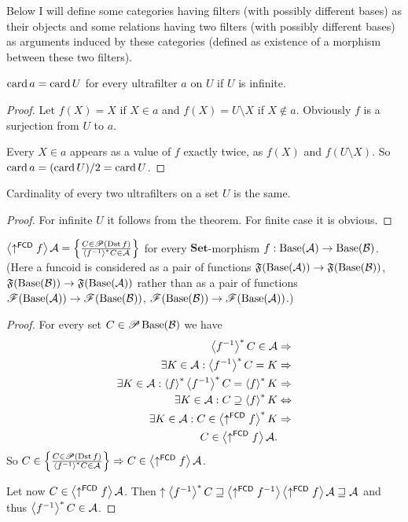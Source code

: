 Below I will define some categories having filters (with possibly
different bases) as their objects and some relations having two filters
(with possibly different bases) as arguments induced by these categories
(defined as existence of a morphism between these two filters).
\begin{thm}
$\operatorname{card} a=\operatorname{card} U$ for every ultrafilter $a$ on $U$ if $U$ is infinite.\end{thm}
\begin{proof}
Let $f(X)=X$ if $X\in a$ and $f(X)=U\setminus X$ if $X\notin a$.
Obviously $f$ is a surjection from $U$ to $a$.

Every $X\in a$ appears as a value of $f$ exactly twice, as $f(X)$
and $f(U\setminus X)$. So $\operatorname{card} a=(\operatorname{card} U)/2=\operatorname{card} U$.\end{proof}
\begin{cor}
Cardinality of every two ultrafilters on a set $U$ is the same.\end{cor}
\begin{proof}
For infinite $U$ it follows from the theorem. For finite case it
is obvious.\end{proof}
\begin{prop}
$\left\langle \uparrow^{\mathsf{FCD}}f\right\rangle\mathcal{A}=\left\{ \frac{C\in\mathscr{P}(\operatorname{Dst} f)}{\left\langle f^{-1}\right\rangle ^{\ast}C\in\mathcal{A}}\right\}$
for every $\mathbf{Set}$-morphism $f:\operatorname{Base}(\mathcal{A})\rightarrow\operatorname{Base}(\mathcal{B})$.
(Here a funcoid is considered as a pair of functions $\mathfrak{F}(\operatorname{Base}(\mathcal{A}))\rightarrow\mathfrak{F}(\operatorname{Base}(\mathcal{B}))$,
$\mathfrak{F}(\operatorname{Base}(\mathcal{B}))\rightarrow\mathfrak{F}(\operatorname{Base}(\mathcal{A}))$
rather than as a pair of functions $\mathscr{F}(\operatorname{Base}(\mathcal{A}))\rightarrow\mathscr{F}(\operatorname{Base}(\mathcal{B}))$,
$\mathscr{F}(\operatorname{Base}(\mathcal{B}))\rightarrow\mathscr{F}(\operatorname{Base}(\mathcal{A}))$.)\end{prop}
\begin{proof}
For every set $C\in\mathscr{P}\operatorname{Base}(\mathcal{B})$ we have
\begin{align*}
\left\langle f^{-1}\right\rangle ^{\ast}C\in\mathcal{A} & \Rightarrow\\
\exists K\in\mathcal{A}:\left\langle f^{-1}\right\rangle ^{\ast}C=K & \Rightarrow\\
\exists K\in\mathcal{A}:\left\langle f\right\rangle ^{\ast}\left\langle f^{-1}\right\rangle ^{\ast}C=\left\langle f\right\rangle ^{\ast}K & \Rightarrow\\
\exists K\in\mathcal{A}:C\supseteq\left\langle f\right\rangle ^{\ast}K & \Leftrightarrow\\
\exists K\in\mathcal{A}:C\in\left\langle \uparrow^{\mathsf{FCD}}f\right\rangle ^{\ast}K & \Rightarrow\\
C\in\left\langle \uparrow^{\mathsf{FCD}}f\right\rangle\mathcal{A}.
\end{align*}
So $C\in \left\{ \frac{C\in\mathscr{P}(\operatorname{Dst} f)}{\left\langle f^{-1}\right\rangle ^{\ast}C\in\mathcal{A}}\right\}\Rightarrow C\in\left\langle \uparrow^{\mathsf{FCD}}f\right\rangle\mathcal{A}$.

Let now $C\in\left\langle \uparrow^{\mathsf{FCD}}f\right\rangle\mathcal{A}$. Then
$\uparrow\left\langle f^{-1}\right\rangle ^{\ast}C\sqsupseteq\left\langle \uparrow^{\mathsf{FCD}}f^{-1}\right\rangle\left\langle \uparrow^{\mathsf{FCD}}f\right\rangle\mathcal{A}\sqsupseteq\mathcal{A}$
and thus $\left\langle f^{-1}\right\rangle ^{\ast}C\in\mathcal{A}$.
\end{proof}
